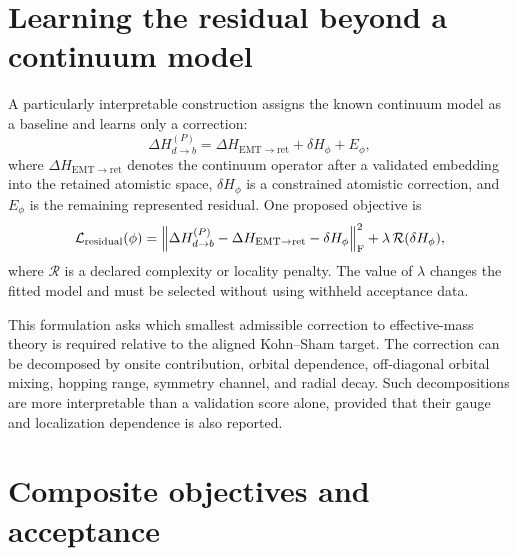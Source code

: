 \section{Learning the residual beyond a continuum model}


A particularly interpretable construction assigns the known continuum model as
a baseline and learns only a correction:
\begin{equation}
  \Delta H_{d\to b}^{(P)}
  =
  \Delta H_{\mathrm{EMT}\to\mathrm{ret}}
  +\delta H_{\phi}
  +E_{\phi},
  \label{eq:emt-residual-decomposition}
\end{equation}
where $\Delta H_{\mathrm{EMT}\to\mathrm{ret}}$ denotes the continuum operator
after a validated embedding into the retained atomistic space, $\delta H_{\phi}$ is a constrained
atomistic correction, and $E_{\phi}$ is the remaining represented residual.
One proposed objective is
\begin{equation}
  \mathcal L_{\rm residual}(\phi)
  =
  \left\|
    \Delta H_{d\to b}^{(P)}
    -\Delta H_{\mathrm{EMT}\to\mathrm{ret}}
    -\delta H_{\phi}
  \right\|_{\mathrm F}^{2}
  +\lambda\,\mathcal R(\delta H_{\phi}),
  \label{eq:residual-learning-loss}
\end{equation}
where $\mathcal R$ is a declared complexity or locality penalty. The value of
$\lambda$ changes the fitted model and must be selected without using withheld
acceptance data.

This formulation asks which smallest admissible correction to effective-mass
theory is required relative to the aligned Kohn--Sham target. The correction can
be decomposed by onsite contribution, orbital dependence, off-diagonal orbital
mixing, hopping range, symmetry channel, and radial decay. Such decompositions
are more interpretable than a validation score alone, provided that their gauge
and localization dependence is also reported.

\section{Composite objectives and acceptance}


